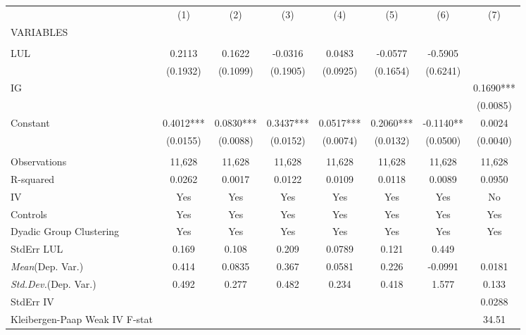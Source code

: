 \documentclass[]{article}
\begin{document}
\begin{tabular}{lccccccc} \hline
 & (1) & (2) & (3) & (4) & (5) & (6) & (7) \\
VARIABLES &  &  &  &  &  &  &  \\ \hline
 &  &  &  &  &  &  &  \\
LUL & 0.2113 & 0.1622 & -0.0316 & 0.0483 & -0.0577 & -0.5905 &  \\
 & (0.1932) & (0.1099) & (0.1905) & (0.0925) & (0.1654) & (0.6241) &  \\
IG &  &  &  &  &  &  & 0.1690*** \\
 &  &  &  &  &  &  & (0.0085) \\
Constant & 0.4012*** & 0.0830*** & 0.3437*** & 0.0517*** & 0.2060*** & -0.1140** & 0.0024 \\
 & (0.0155) & (0.0088) & (0.0152) & (0.0074) & (0.0132) & (0.0500) & (0.0040) \\
 &  &  &  &  &  &  &  \\
Observations & 11,628 & 11,628 & 11,628 & 11,628 & 11,628 & 11,628 & 11,628 \\
R-squared & 0.0262 & 0.0017 & 0.0122 & 0.0109 & 0.0118 & 0.0089 & 0.0950 \\
IV & Yes & Yes & Yes & Yes & Yes & Yes & No \\
Controls & Yes & Yes & Yes & Yes & Yes & Yes & Yes \\
Dyadic Group Clustering & Yes & Yes & Yes & Yes & Yes & Yes & Yes \\
StdErr LUL & 0.169 & 0.108 & 0.209 & 0.0789 & 0.121 & 0.449 &  \\
\textit{Mean}(Dep. Var.) & 0.414 & 0.0835 & 0.367 & 0.0581 & 0.226 & -0.0991 & 0.0181 \\
\textit{Std.Dev.}(Dep. Var.) & 0.492 & 0.277 & 0.482 & 0.234 & 0.418 & 1.577 & 0.133 \\
StdErr IV &  &  &  &  &  &  & 0.0288 \\
 Kleibergen-Paap Weak IV F-stat &  &  &  &  &  &  & 34.51 \\ \hline
\end{tabular}
\end{document}
